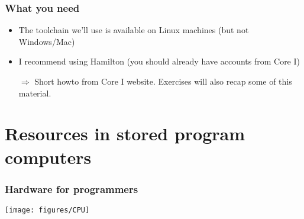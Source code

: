 \documentclass[presentation,aspectratio=43,10pt]{beamer}
\begin{document}
\begin{frame}
  \frametitle{What you need}
  \begin{itemize}
  \item The toolchain we'll use is available on Linux machines (but
    not Windows/Mac)
  \item I recommend using Hamilton (you should already have accounts
    from Core I)
  \item[$\Rightarrow$] Short howto from Core I website. Exercises will
    also recap some of this material.
  \end{itemize}
\end{frame}

\section{Resources in stored program computers}

\begin{frame}
  \frametitle{Hardware for programmers}
  \begin{center}
    \texttt{[image: figures/CPU]}
  \end{center}
\end{frame}
\end{document}
